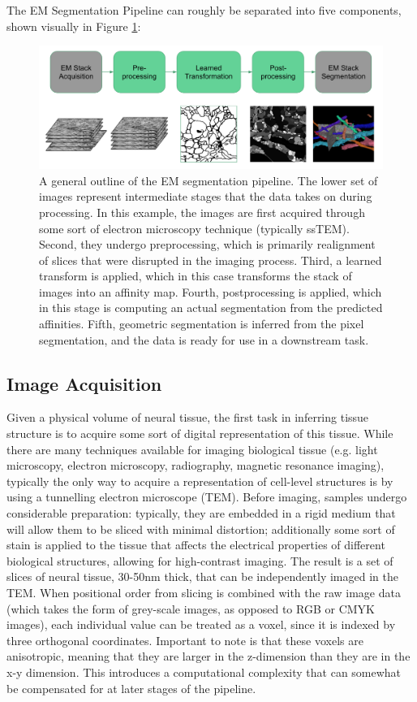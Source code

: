 The EM Segmentation Pipeline can roughly be separated into five components, shown visually in Figure \ref{fig:segmentation_pipeline}:

\begin{figure}
\centering
\includegraphics[width=\textwidth]{img/seg_pipeline.png}
\caption[A general outline of the EM segmentation pipeline]{A general outline of the EM segmentation pipeline. The lower set of images represent intermediate stages that the data takes on during processing. In this example, the images are first acquired through some sort of electron microscopy technique (typically ssTEM). Second, they undergo preprocessing, which is primarily realignment of slices that were disrupted in the imaging process. Third, a learned transform is applied, which in this case transforms the stack of images into an affinity map. Fourth, postprocessing is applied, which in this stage is computing an actual segmentation from the predicted affinities. Fifth, geometric segmentation is inferred from the pixel segmentation, and the data is ready for use in a downstream task. }
\label{fig:segmentation_pipeline}
\end{figure}

\subsection{Image Acquisition}
Given a physical volume of neural tissue, the first task in inferring tissue structure is to acquire some sort of digital representation of this tissue. While there are many techniques available for imaging biological tissue (e.g. light microscopy, electron microscopy, radiography, magnetic resonance imaging), typically the only way to acquire a representation of cell-level structures is by using a tunnelling electron microscope (TEM)\cite{Mielanczyk2015}. Before imaging, samples undergo considerable preparation: typically, they are embedded in a rigid medium that will allow them to be sliced with minimal distortion; additionally some sort of stain is applied to the tissue that affects the electrical properties of different biological structures, allowing for high-contrast imaging. The result is a set of slices of neural tissue, 30-50nm thick, that can be independently imaged in the TEM. When positional order from slicing is combined with the raw image data (which takes the form of grey-scale images, as opposed to RGB or CMYK images), each individual value can be treated as a voxel, since it is indexed by three orthogonal coordinates. Important to note is that these voxels are anisotropic, meaning that they are larger in the z-dimension than they are in the x-y dimension. This introduces a computational complexity that can somewhat be compensated for at later stages of the pipeline.

